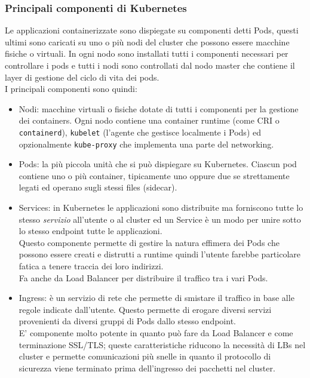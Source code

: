 \subsubsection{Principali componenti di Kubernetes}
Le applicazioni containerizzate sono dispiegate su componenti detti Pods, questi ultimi sono caricati su uno o più nodi del cluster che possono essere macchine fisiche o virtuali. In ogni nodo sono installati tutti i componenti necessari per controllare i pods e tutti i nodi sono controllati dal nodo master che contiene il layer di gestione del ciclo di vita dei pods.\\
I principali componenti sono quindi:
\begin{itemize}
    \item {
        Nodi: macchine virtuali o fisiche dotate di tutti i componenti per la gestione dei containers. Ogni nodo contiene una container runtime (come CRI o \texttt{containerd}), \texttt{kubelet} (l'agente che gestisce localmente i Pods) ed opzionalmente \texttt{kube-proxy} che implementa una parte del networking.
    }
    \item {
        Pods: la più piccola unità che si può dispiegare su Kubernetes. Ciascun pod contiene uno o più container, tipicamente uno oppure due se strettamente legati ed operano sugli stessi files (sidecar).
    }
    \item {
        Services: in Kubernetes le applicazioni sono distribuite ma forniscono tutte lo stesso \textit{servizio} all'utente o al cluster ed un Service è un modo per unire sotto lo stesso endpoint tutte le applicazioni.\\
        Questo componente permette di gestire la natura effimera dei Pods che possono essere creati e distrutti a runtime quindi l'utente farebbe particolare fatica a tenere traccia dei loro indirizzi.\\
        Fa anche da Load Balancer per distribuire il traffico tra i vari Pods.
    }
    \item {
        Ingress: è un servizio di rete che permette di smistare il traffico in base alle regole indicate dall'utente. Questo permette di erogare diversi servizi provenienti da diversi gruppi di Pods dallo stesso endpoint.\\
        E' componente molto potente in quanto può fare da Load Balancer e come terminazione SSL/TLS; queste caratteristiche riducono la necessità di LBs nel cluster e permette comunicazioni più snelle in quanto il protocollo di sicurezza viene terminato prima dell'ingresso dei pacchetti nel cluster.\\
}
\end{itemize}
